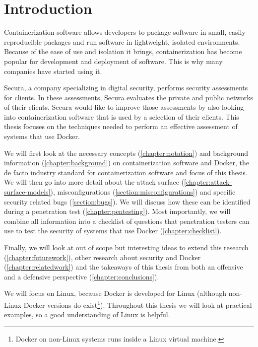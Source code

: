 \chapter{Introduction}
Containerization software allows developers to package software in small, easily reproducible packages and run software in lightweight, isolated environments. Because of the ease of use and isolation it brings, containerization has become popular for development and deployment of software. This is why many companies have started using it.

Secura, a company specializing in digital security, performs security assessments for clients. In these assessments, Secura evaluates the private and public networks of their clients. Secura would like to improve those assessments by also looking into containerization software that is used by a selection of their clients. This thesis focuses on the techniques needed to perform an effective assessment of systems that use Docker.

\medskip

We will first look at the necessary concepts (\autoref{chapter:notation}) and background information (\autoref{chapter:background}) on containerization software and Docker, the de facto industry standard for containerization software and focus of this thesis. We will then go into more detail about the attack surface (\autoref{chapter:attack-surface-models}), misconfigurations (\autoref{section:misconfigurations}) and specific security related bugs (\autoref{section:bugs}). We will discuss how these can be identified during a penetration test (\autoref{chapter:pentesting}). Most importantly, we will combine all information into a checklist of questions that penetration testers can use to test the security of systems that use Docker (\autoref{chapter:checklist}).

Finally, we will look at out of scope but interesting ideas to extend this research (\autoref{chapter:futurework}), other research about security and Docker (\autoref{chapter:relatedwork}) and the takeaways of this thesis from both an offensive and a defensive perspective (\autoref{chapter:conclusions}).

\medskip

We will focus on Linux, because Docker is developed for Linux (although non-Linux Docker versions do exist\footnote{Docker on non-Linux systems runs inside a Linux virtual machine.}). Throughout this thesis we will look at practical examples, so a good understanding of Linux is helpful.
